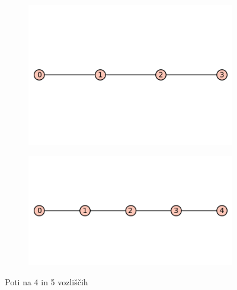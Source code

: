 \documentclass[12pt, a4paper]{article}
\begin{document}
\begin{center}
\begin{figure}[!htb]
\centering
\begin{subfigure}{0.5\textwidth}
  \centering
  \includegraphics[width=0.4\linewidth]{4-pot}
\end{subfigure}%
\begin{subfigure}{0.5\textwidth}
  \centering
  \includegraphics[width=0.5\linewidth]{5-pot}
\end{subfigure}
\caption{Poti na 4 in 5 vozliščih}
\label{fig:test}
\end{figure}

\end{center}
\end{document}
